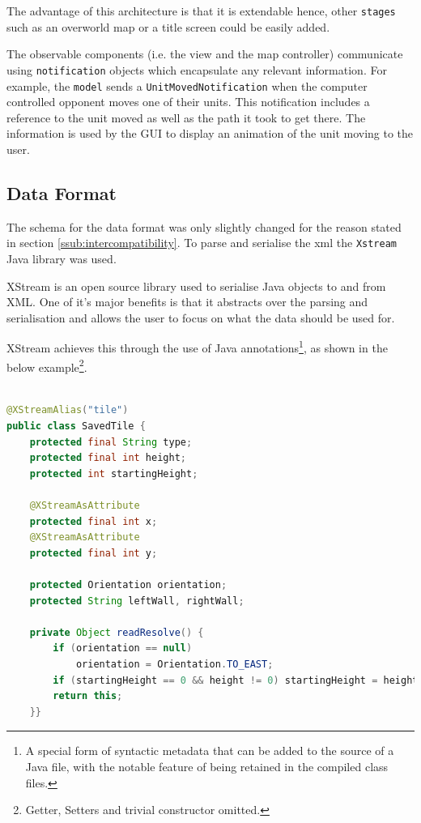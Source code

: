 The advantage of this architecture is that it is extendable hence, other \texttt{stages} such as an overworld map or a title screen could be easily added.


The observable components (i.e. the view and the map controller) communicate using \texttt{notification} objects which encapsulate any relevant information. For example, the \texttt{model} sends a \texttt{UnitMovedNotification} when the computer controlled opponent moves one of their units. This notification includes a reference to the unit moved as well as the path it took to get there. The information is used by the GUI to display an animation of the unit moving to the user.

\clearpage
\subsection{Data Format}
\label{sub:data_format}

The schema for the data format was only slightly changed for the reason stated in section \ref{ssub:intercompatibility}. To parse and serialise the xml the \texttt{Xstream} Java library was used\cite{xstream}.
 
XStream is an open source library used to serialise Java objects to and from XML. One of it's major benefits is that it abstracts over the parsing and serialisation and allows the user to focus on what the data should be used for. 

XStream achieves this through the use of Java annotations\footnote{A special form of syntactic metadata that can be added to the source of a Java file, with the notable feature of being retained in the compiled class files.}, as shown in the below example\footnote{Getter, Setters and trivial constructor omitted.}.

\begin{lstlisting}[caption=Example of class that is serialisable with XStream, label=lst:SavedTile, language=java] %Java
	
@XStreamAlias("tile")
public class SavedTile {
	protected final String type;
	protected final int height; 
	protected int startingHeight;
	
	@XStreamAsAttribute
	protected final int x;
	@XStreamAsAttribute
	protected final int y;

	protected Orientation orientation;
	protected String leftWall, rightWall;
	
	private Object readResolve() {
		if (orientation == null)  
			orientation = Orientation.TO_EAST;
		if (startingHeight == 0 && height != 0) startingHeight = height;
		return this;
	}}
\end{lstlisting}

